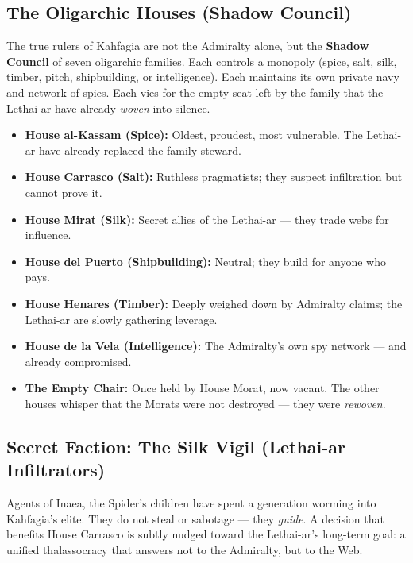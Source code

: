 \subsection*{The Oligarchic Houses (Shadow Council)}
\label{sec:kahfagia-houses}

The true rulers of Kahfagia are not the Admiralty alone, but the \textbf{Shadow Council} of seven oligarchic families. Each controls a monopoly (spice, salt, silk, timber, pitch, shipbuilding, or intelligence). Each maintains its own private navy and network of spies. Each vies for the empty seat left by the family that the Lethai-ar have already \emph{woven} into silence.

\begin{itemize}
  \item \textbf{House al-Kassam (Spice):} Oldest, proudest, most vulnerable. The Lethai-ar have already replaced the family steward.
  \item \textbf{House Carrasco (Salt):} Ruthless pragmatists; they suspect infiltration but cannot prove it.
  \item \textbf{House Mirat (Silk):} Secret allies of the Lethai-ar --- they trade webs for influence.
  \item \textbf{House del Puerto (Shipbuilding):} Neutral; they build for anyone who pays.
  \item \textbf{House Henares (Timber):} Deeply weighed down by Admiralty claims; the Lethai-ar are slowly gathering leverage.
  \item \textbf{House de la Vela (Intelligence):} The Admiralty's own spy network --- and already compromised.
  \item \textbf{The Empty Chair:} Once held by House Morat, now vacant. The other houses whisper that the Morats were not destroyed --- they were \emph{rewoven}.
\end{itemize}

\subsection*{Secret Faction: The Silk Vigil (Lethai-ar Infiltrators)}
\label{sec:kahfagia-silk-vigil}

Agents of Inaea, the Spider's children have spent a generation worming into Kahfagia's elite. They do not steal or sabotage --- they \emph{guide}. A decision that benefits House Carrasco is subtly nudged toward the Lethai-ar's long-term goal: a unified thalassocracy that answers not to the Admiralty, but to the Web.

